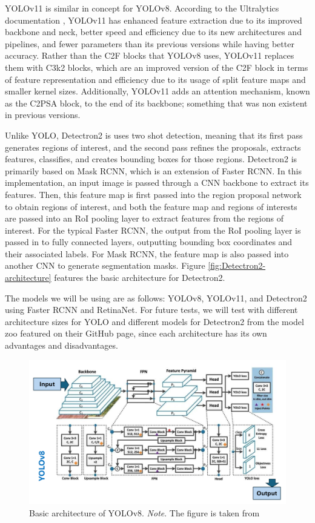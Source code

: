 \documentclass[stu,12pt,floatsintext]{apa7}
\begin{document}
YOLOv11 is similar in concept for YOLOv8. According to the Ultralytics documentation \parencite{yolo11_ultralytics}, YOLOv11 has enhanced feature extraction due to its improved backbone and neck, better speed and efficiency due to its new architectures and pipelines, and fewer parameters than its previous versions while having better accuracy. Rather than the C2F blocks that YOLOv8 uses, YOLOv11 replaces them with C3k2 blocks, which are an improved version of the C2F block in terms of feature representation and efficiency due to its usage of split feature maps and smaller kernel sizes. Additionally, YOLOv11 adds an attention mechanism, known as the C2PSA block, to the end of its backbone; something that was non existent in previous versions. 

Unlike YOLO, Detectron2 is uses two shot detection, meaning that its first pass generates regions of interest, and the second pass refines the proposals, extracts features, classifies, and creates bounding boxes for those regions. Detectron2 is primarily based on Mask RCNN, which is an extension of Faster RCNN. In this implementation, an input image is passed through a CNN backbone to extract its features. Then, this feature map is first passed into the region proposal network to obtain regions of interest, and both the feature map and regions of interests are passed into an RoI pooling layer to extract features from the regions of interest. For the typical Faster RCNN, the output from the RoI pooling layer is passed in to fully connected layers, outputting bounding box coordinates and their associated labels. For Mask RCNN, the feature map is also passed into another CNN to generate segmentation masks. Figure \ref{fig:Detectron2-architecture} features the basic architecture for Detectron2.


The models we will be using are as follows: YOLOv8, YOLOv11, and Detectron2 using Faster RCNN and RetinaNet. For future tests, we will test with different architecture sizes for YOLO and different models for Detectron2 from the model zoo featured on their GitHub page, since each architecture has its own advantages and disadvantages.

 \begin{figure}[!htb]
     \centering
     \includegraphics[width=0.75\linewidth]{images/YOLOv8_architecture.png}
     \caption{Basic architecture of YOLOv8. 
     \textit{Note}. The figure is taken from \textcite{Ranjan2024YOLOv8_11Comparison}}
     \label{fig:YOLOv8-architecture}
 \end{figure}
\end{document}
